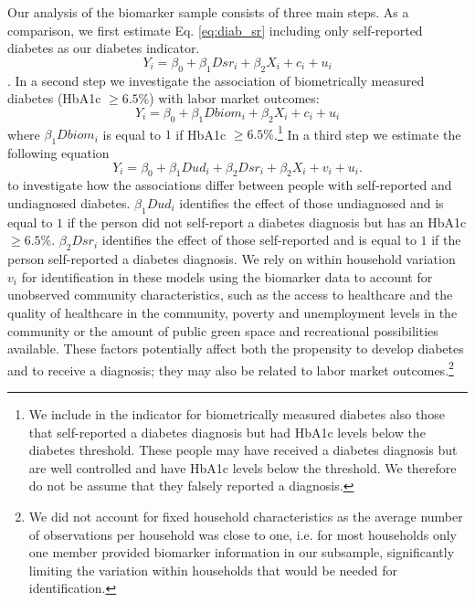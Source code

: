 \documentclass[12pt,english]{article}
\begin{document}
Our analysis of the biomarker sample consists of three main steps. As a comparison, we first estimate Eq. \ref{eq:diab_sr} including only self-reported diabetes as our diabetes indicator.
\begin{equation}
Y_{i}=\beta_{0}+\beta_{1}Dsr_{i}+\beta_{2}X_{i}+c_{i}+u_{i}\label{eq:diab_sr}
\end{equation}. 
In a second step we investigate the association of biometrically  
measured diabetes (HbA1c $\geq6.5\%$) with labor market outcomes: 
\begin{equation}
Y_{i}=\beta_{0}+\beta_{1}Dbiom_{i}+\beta_{2}X_{i}+c_{i}+u_{i}\label{eq:diab_objective}
\end{equation}
where $\beta_{1}Dbiom_{i}$ is equal to $1$ if HbA1c $\geq6.5\%$.\footnote{We include in the indicator for biometrically measured diabetes also those that self-reported a diabetes diagnosis but had \ac{HbA1c} levels below the diabetes threshold. These people may have received a diabetes diagnosis but are well controlled and have \ac{HbA1c} levels below the threshold. We therefore do not be assume that they falsely reported a diagnosis.}
In a third step we estimate the following equation 
\begin{equation}
Y_{i}=\beta_{0}+\beta_{1}Dud_{i}+\beta_{2}Dsr_{i}+\beta_{2}X_{i}+v_{i}+u_{i}.\label{eq:diab_sr_ud}
\end{equation}
to investigate how the associations differ between people with self-reported and undiagnosed diabetes. $\beta_{1}Dud_{i}$ identifies the effect of those undiagnosed and is equal to $1$ if the person did not self-report a diabetes diagnosis but has an HbA1c $\geq6.5\%$. $\beta_{2}Dsr_{i}$ identifies the effect of those self-reported and is equal to $1$ if the person self-reported a diabetes diagnosis.  We rely on within household variation $v_{i}$ for identification in these models using the biomarker data to account for unobserved community characteristics, such as the access to healthcare and the quality of healthcare in the community, poverty and unemployment levels in the community or the amount of public green space and recreational possibilities available. These factors potentially affect both the propensity to develop diabetes and to receive a diagnosis; they may also be related to labor market outcomes.\footnote{We did not account for fixed household characteristics as the average number of observations per household was close to one, i.e. for most households only one member provided biomarker information in our subsample, significantly limiting the variation within households that would be needed for identification.}
\end{document}
